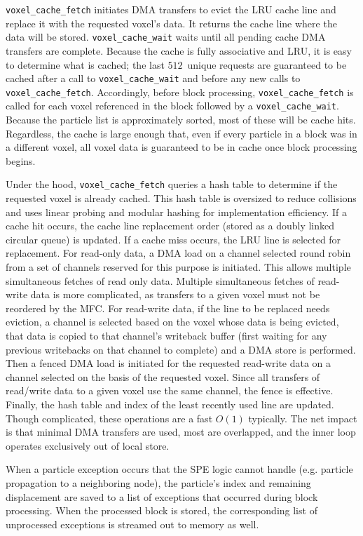 \documentclass[journal,twoside]{IEEEtran}
\begin{document}
\verb+voxel_cache_fetch+ initiates DMA transfers to evict the LRU
cache line and replace it with the requested voxel's data.  It returns
the cache line where the data will be stored.  \verb+voxel_cache_wait+
waits until all pending cache DMA transfers are complete.  Because the
cache is fully associative and LRU, it is easy to determine what is
cached; the last $512$~unique requests are guaranteed to be cached
after a call to \verb+voxel_cache_wait+ and before any new calls to
\verb+voxel_cache_fetch+.  Accordingly, before block processing,
\verb+voxel_cache_fetch+ is called for each voxel referenced in the
block followed by a \verb+voxel_cache_wait+.  Because the particle
list is approximately sorted, most of these will be cache hits.
Regardless, the cache is large enough that, even if every particle in
a block was in a different voxel, all voxel data is guaranteed to be
in cache once block processing begins.

Under the hood, \verb+voxel_cache_fetch+ queries a hash table to
determine if the requested voxel is already cached.  This hash table
is oversized to reduce collisions and uses linear probing and modular
hashing for implementation efficiency.  If a cache hit occurs, the cache line
replacement order (stored as a doubly linked circular queue) is
updated.  If a cache miss occurs, the LRU line is selected for replacement.
For read-only data, a DMA load on a channel selected round robin from
a set of channels reserved for this purpose is initiated.  This allows
multiple simultaneous fetches of read only data.  Multiple
simultaneous fetches of read-write data is more complicated, as
transfers to a given voxel must not be reordered by the MFC.  For
read-write data, if the line to be replaced needs eviction, a channel is
selected based on the voxel whose data is being evicted, that data is
copied to that channel's writeback buffer (first waiting for any
previous writebacks on that channel to complete) and a DMA store is
performed.  Then a fenced DMA load is initiated for the requested
read-write data on a channel selected on the basis of the requested voxel.
Since all transfers of read/write data to a given voxel use the same
channel, the fence is effective.  Finally, the hash table and index of
the least recently used line are updated.  Though complicated, these
operations are a fast $O(1)$ typically.  The net impact is that
minimal DMA transfers are used, most are overlapped, and the inner loop
operates exclusively out of local store.

When a particle exception occurs that the SPE logic cannot handle
(e.g. particle propagation to a neighboring node), the particle's
index and remaining displacement are saved to a list of exceptions
that occurred during block processing.  When the processed block is
stored, the corresponding list of unprocessed exceptions is streamed
out to memory as well.
\end{document}
